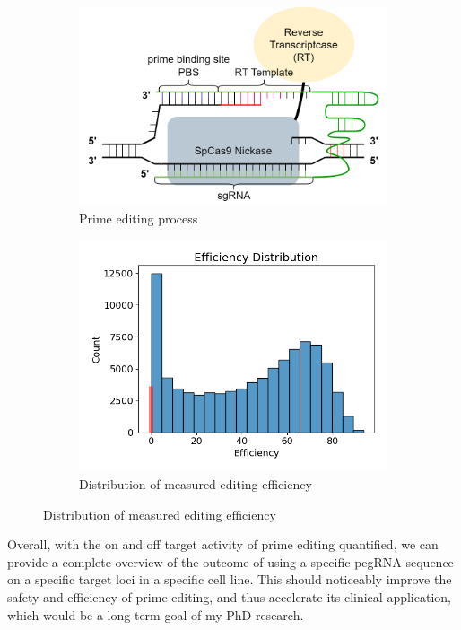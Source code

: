 \documentclass[a4,12pt]{article}
\begin{document}
\begin{figure}
    \centering
    \begin{subfigure}{0.4\textwidth}
        \includegraphics[width=\textwidth]{prime-editing-process.png}
        \caption{Prime editing process}
        \label{fig:prime-editing-process}
    \end{subfigure}
    \begin{subfigure}{0.35\textwidth}
        \includegraphics[width=\textwidth]{efficiency_distribution.png}
        \caption{Distribution of measured editing efficiency}
    \end{subfigure}
\end{figure}

Overall, with the on and off target activity of prime editing quantified, we can provide a complete overview of the outcome of using a specific pegRNA sequence on a specific target loci in a specific cell line. This should noticeably improve the safety and efficiency of prime editing, and thus accelerate its clinical application, which would be a long-term goal of my PhD research. 
\end{document}
